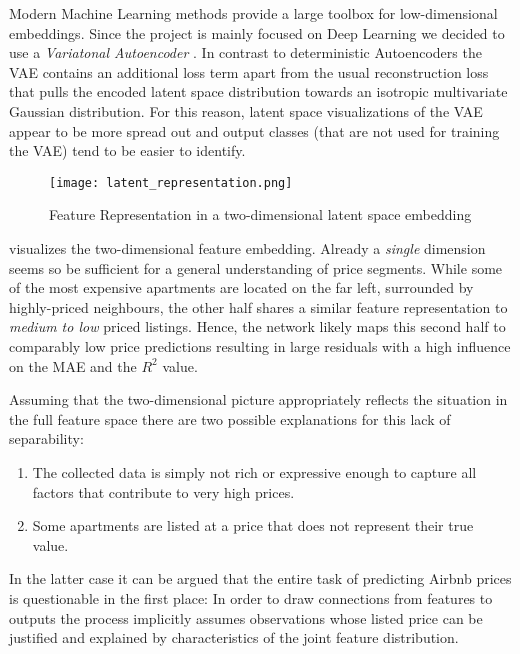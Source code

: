 Modern Machine Learning methods provide a large toolbox for low-dimensional embeddings.
Since the project is mainly focused on Deep Learning we decided to use a \emph{Variatonal Autoencoder} \citep{kingma2014}.
In contrast to deterministic Autoencoders the VAE contains an additional loss term apart from the usual reconstruction loss that pulls the encoded latent space distribution towards an isotropic multivariate Gaussian distribution.
For this reason, latent space visualizations of the VAE appear to be more spread out and output classes (that are not used for training the VAE) tend to be easier to identify.

\begin{figure}[t]
  \centering
  \texttt{[image: latent\_representation.png]}
  \caption{Feature Representation in a two-dimensional latent space embedding}
  \label{fig:latent-representation}
\end{figure}

 visualizes the two-dimensional feature embedding.
Already a \emph{single} dimension seems so be sufficient for a general understanding of price segments.
While some of the most expensive apartments are located on the far left, surrounded by highly-priced neighbours, the other half shares a similar feature representation to \emph{medium to low} priced listings.
Hence, the network likely maps this second half to comparably low price predictions resulting in large residuals with a high influence on the MAE and the $R^2$ value.

Assuming that the two-dimensional picture appropriately reflects the situation in the full feature space there are two possible explanations for this lack of separability:
\begin{enumerate}
  \item The collected data is simply not rich or expressive enough to capture all factors that contribute to very high prices.
  \item Some apartments are listed at a price that does not represent their true value.
\end{enumerate}

In the latter case it can be argued that the entire task of predicting Airbnb prices is questionable in the first place:
In order to draw connections from features to outputs the process implicitly assumes observations whose listed price can be justified and explained by characteristics of the joint feature distribution.

